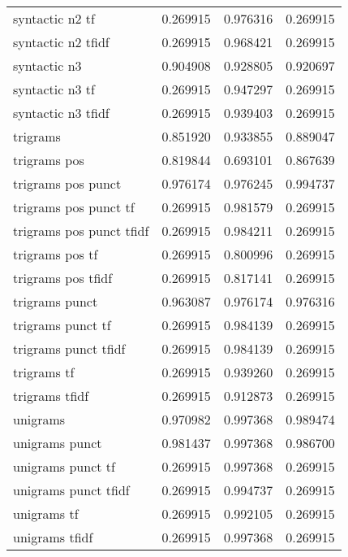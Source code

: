 \documentclass{article}
\begin{document}
\begin{table}
\begin{tabular}{lrrr}
syntactic n2 tf            &  0.269915 &       0.976316 &             0.269915 \\
syntactic n2 tfidf         &  0.269915 &       0.968421 &             0.269915 \\
syntactic n3               &  0.904908 &       0.928805 &             0.920697 \\
syntactic n3 tf            &  0.269915 &       0.947297 &             0.269915 \\
syntactic n3 tfidf         &  0.269915 &       0.939403 &             0.269915 \\
trigrams                   &  0.851920 &       0.933855 &             0.889047 \\
trigrams pos               &  0.819844 &       0.693101 &             0.867639 \\
trigrams pos punct         &  0.976174 &       0.976245 &             0.994737 \\
trigrams pos punct tf      &  0.269915 &       0.981579 &             0.269915 \\
trigrams pos punct tfidf   &  0.269915 &       0.984211 &             0.269915 \\
trigrams pos tf            &  0.269915 &       0.800996 &             0.269915 \\
trigrams pos tfidf         &  0.269915 &       0.817141 &             0.269915 \\
trigrams punct             &  0.963087 &       0.976174 &             0.976316 \\
trigrams punct tf          &  0.269915 &       0.984139 &             0.269915 \\
trigrams punct tfidf       &  0.269915 &       0.984139 &             0.269915 \\
trigrams tf                &  0.269915 &       0.939260 &             0.269915 \\
trigrams tfidf             &  0.269915 &       0.912873 &             0.269915 \\
unigrams                   &  0.970982 &       0.997368 &             0.989474 \\
unigrams punct             &  0.981437 &       0.997368 &             0.986700 \\
unigrams punct tf          &  0.269915 &       0.997368 &             0.269915 \\
unigrams punct tfidf       &  0.269915 &       0.994737 &             0.269915 \\
unigrams tf                &  0.269915 &       0.992105 &             0.269915 \\
unigrams tfidf             &  0.269915 &       0.997368 &             0.269915 \\
\bottomrule
\end{tabular}
\end{table}
\end{document}
